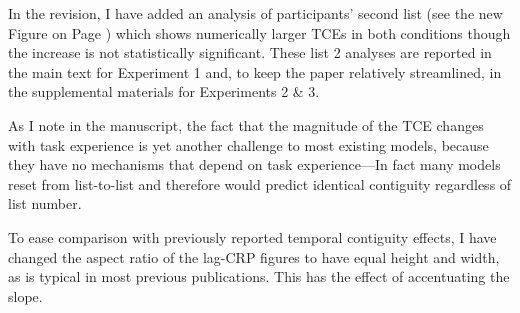 \documentclass[12pt]{article}
\begin{document}
\begin{enumerate}
	In the revision, I have added an analysis of participants' second list (see the new Figure on Page \pageref{TODO-6}) which shows numerically larger TCEs in both conditions though the increase is not statistically significant. These list 2 analyses are reported in the main text for Experiment 1 and, to keep the paper relatively streamlined, in the supplemental materials for Experiments 2 \& 3.

	As I note in the manuscript, the fact that the magnitude of the TCE changes with task experience is yet another challenge to most existing models, because they have no mechanisms that depend on task experience---In fact many models reset from list-to-list and therefore would predict identical contiguity regardless of list number.

	To ease comparison with previously reported temporal contiguity effects, I have changed the aspect ratio of the lag-CRP figures to have equal height and width, as is typical in most previous publications. This has the effect of accentuating the slope. 



\end{enumerate}
\end{document}
